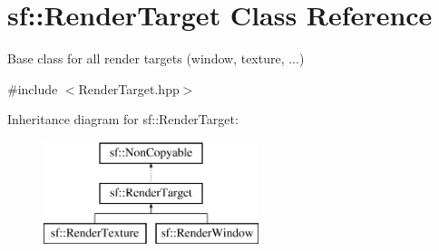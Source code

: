 \hypertarget{classsf_1_1_render_target}{}\section{sf\+:\+:Render\+Target Class Reference}
\label{classsf_1_1_render_target}


Base class for all render targets (window, texture, ...)  




{\ttfamily \#include $<$Render\+Target.\+hpp$>$}

Inheritance diagram for sf\+:\+:Render\+Target\+:\begin{figure}[H]
\begin{center}
\leavevmode
\includegraphics[height=3.000000cm]{classsf_1_1_render_target}
\end{center}
\end{figure}
